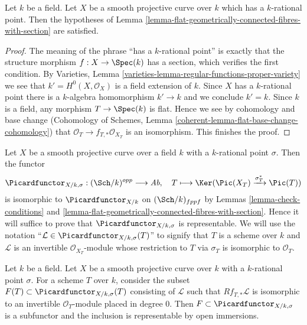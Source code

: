 \begin{lemma}
\label{lemma-check-conditions}
Let $k$ be a field. Let $X$ be a smooth projective curve over $k$
which has a $k$-rational point. Then the hypotheses of
Lemma \ref{lemma-flat-geometrically-connected-fibres-with-section}
are satisfied.
\end{lemma}

\begin{proof}
The meaning of the phrase ``has a $k$-rational point'' is exactly that
the structure morphism $f : X \to \Spec(k)$ has a section, which
verifies the first condition.
By Varieties, Lemma \ref{varieties-lemma-regular-functions-proper-variety}
we see that $k' = H^0(X, \mathcal{O}_X)$ is a field extension of $k$.
Since $X$ has a $k$-rational point there is a $k$-algebra homomorphism
$k' \to k$ and we conclude $k' = k$.
Since $k$ is a field, any morphism $T \to \Spec(k)$ is flat.
Hence we see by cohomology and base change
(Cohomology of Schemes, Lemma \ref{coherent-lemma-flat-base-change-cohomology})
that $\mathcal{O}_T \to f_{T, *}\mathcal{O}_{X_T}$ is an isomorphism.
This finishes the proof.
\end{proof}

\noindent
Let $X$ be a smooth projective curve over a field $k$ with a
$k$-rational point $\sigma$. Then the functor
$$
\Picardfunctor_{X/k, \sigma} : (\Sch/k)^{opp} \longrightarrow \textit{Ab},\quad
T \longmapsto \Ker(\Pic(X_T) \xrightarrow{\sigma_T^*} \Pic(T))
$$
is isomorphic to $\Picardfunctor_{X/k}$ on $(\Sch/k)_{fppf}$
by Lemmas \ref{lemma-check-conditions} and
\ref{lemma-flat-geometrically-connected-fibres-with-section}.
Hence it will suffice to prove that $\Picardfunctor_{X/k, \sigma}$
is representable. We will use the notation
``$\mathcal{L} \in \Picardfunctor_{X/k, \sigma}(T)$'' to signify that
$T$ is a scheme over $k$ and $\mathcal{L}$ is an invertible
$\mathcal{O}_{X_T}$-module whose restriction to $T$ via $\sigma_T$
is isomorphic to $\mathcal{O}_T$.

\begin{lemma}
\label{lemma-define-open}
Let $k$ be a field. Let $X$ be a smooth projective curve over $k$
with a $k$-rational point $\sigma$. For a scheme $T$ over $k$,
consider the subset $F(T) \subset \Picardfunctor_{X/k, \sigma}(T)$ consisting of
$\mathcal{L}$ such that $Rf_{T, *}\mathcal{L}$ is isomorphic to an invertible
$\mathcal{O}_T$-module placed in degree $0$. Then
$F \subset \Picardfunctor_{X/k, \sigma}$ is a subfunctor and the inclusion is
representable by open immersions.
\end{lemma}

